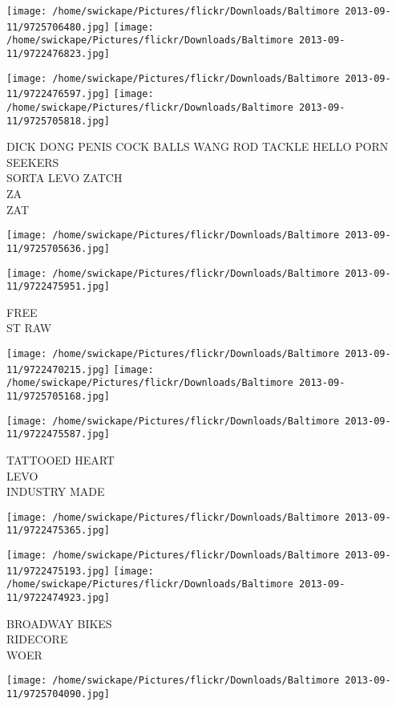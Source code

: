 \documentclass[10pt,letterpaper]{article}
\begin{document}
\texttt{[image: /home/swickape/Pictures/flickr/Downloads/Baltimore 2013-09-11/9725706480.jpg]}
\texttt{[image: /home/swickape/Pictures/flickr/Downloads/Baltimore 2013-09-11/9722476823.jpg]}

\texttt{[image: /home/swickape/Pictures/flickr/Downloads/Baltimore 2013-09-11/9722476597.jpg]}
\texttt{[image: /home/swickape/Pictures/flickr/Downloads/Baltimore 2013-09-11/9725705818.jpg]}

DICK DONG PENIS COCK BALLS WANG ROD TACKLE HELLO PORN SEEKERS\\
SORTA LEVO ZATCH\\
ZA\\
ZAT
\pagebreak

\texttt{[image: /home/swickape/Pictures/flickr/Downloads/Baltimore 2013-09-11/9725705636.jpg]}

\vspace{0.25in}
\texttt{[image: /home/swickape/Pictures/flickr/Downloads/Baltimore 2013-09-11/9722475951.jpg]}

FREE\\
ST RAW
\pagebreak

\texttt{[image: /home/swickape/Pictures/flickr/Downloads/Baltimore 2013-09-11/9722470215.jpg]}
\texttt{[image: /home/swickape/Pictures/flickr/Downloads/Baltimore 2013-09-11/9725705168.jpg]}

\texttt{[image: /home/swickape/Pictures/flickr/Downloads/Baltimore 2013-09-11/9722475587.jpg]}

TATTOOED HEART\\
LEVO\\
INDUSTRY MADE
\pagebreak

\texttt{[image: /home/swickape/Pictures/flickr/Downloads/Baltimore 2013-09-11/9722475365.jpg]}

\vspace{0.25in}
\texttt{[image: /home/swickape/Pictures/flickr/Downloads/Baltimore 2013-09-11/9722475193.jpg]}
\texttt{[image: /home/swickape/Pictures/flickr/Downloads/Baltimore 2013-09-11/9722474923.jpg]}

BROADWAY BIKES\\
RIDECORE\\
WOER
\pagebreak

\texttt{[image: /home/swickape/Pictures/flickr/Downloads/Baltimore 2013-09-11/9725704090.jpg]}
\end{document}
